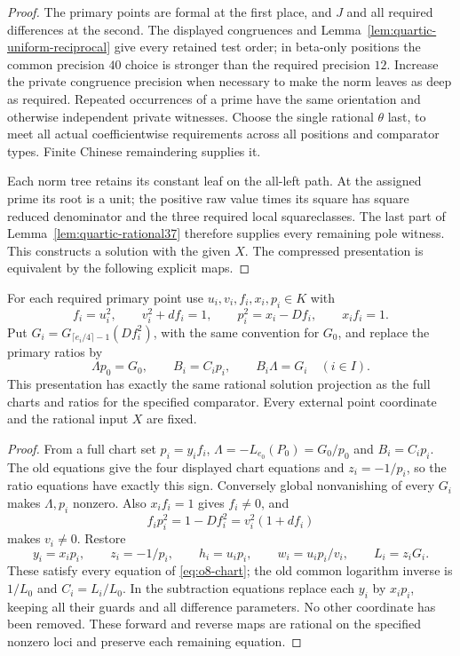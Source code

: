 \begin{proof}
The primary points are formal at the first place, and $J$ and all
required differences at the second. The displayed congruences and
Lemma~\ref{lem:quartic-uniform-reciprocal} give every retained test order;
in beta-only positions the common precision $40$ choice is stronger
than the required precision $12$. Increase the private congruence
precision when necessary to make the norm leaves as deep as required.
Repeated occurrences of a prime have the same orientation and otherwise
independent private witnesses. Choose the single rational $\theta$ last,
to meet all actual coefficientwise requirements across all positions
and comparator types. Finite Chinese remaindering supplies it.

Each norm tree retains its constant leaf on the all-left path. At the
assigned prime its root is a unit; the positive raw value times its
square has square reduced denominator and the three required local
squareclasses. The last part of Lemma~\ref{lem:quartic-rational37}
therefore supplies every remaining pole witness. This constructs a
solution with the given $X$. The compressed presentation is equivalent
by the following explicit maps.
\end{proof}

\begin{lemma}
\label{lem:quartic-compressed-primary}
For each required primary point use $u_i,v_i,f_i,x_i,p_i\in K$ with
\[
 f_i=u_i^2,\qquad v_i^2+df_i=1,\qquad
 p_i^2=x_i-Df_i,\qquad x_if_i=1.
\]
Put $G_i=G_{\lceil e_i/4\rceil-1}(Df_i^2)$, with the same convention
for $G_0$, and replace the primary ratios by
\[
 \Lambda p_0=G_0,\qquad B_i=C_ip_i,\qquad B_i\Lambda=G_i
 \quad(i\in I).
\]
This presentation has exactly the same rational solution projection as
the full charts and ratios for the specified comparator. Every external
point coordinate and the rational input $X$ are fixed.
\end{lemma}
\begin{proof}
From a full chart set $p_i=y_if_i$, $\Lambda=-L_{e_0}(P_0)=G_0/p_0$
and $B_i=C_ip_i$. The old equations give the four displayed chart
equations and $z_i=-1/p_i$, so the ratio equations have exactly this sign.
Conversely global nonvanishing of every $G_i$ makes $\Lambda,p_i$
nonzero. Also $x_if_i=1$ gives $f_i\ne0$, and
\[
 f_ip_i^2=1-Df_i^2=v_i^2(1+df_i)
\]
makes $v_i\ne0$. Restore
\[
 y_i=x_ip_i,\qquad z_i=-1/p_i,\qquad
 h_i=u_ip_i,\qquad w_i=u_ip_i/v_i,
 \qquad L_i=z_iG_i.
\]
These satisfy every equation of \eqref{eq:o8-chart}; the old common
logarithm inverse is $1/L_0$ and $C_i=L_i/L_0$.
In the subtraction equations replace each $y_i$ by $x_ip_i$, keeping
all their guards and all difference parameters. No other coordinate
has been removed. These forward and reverse maps are rational on the
specified nonzero loci and preserve each remaining equation.
\end{proof}


